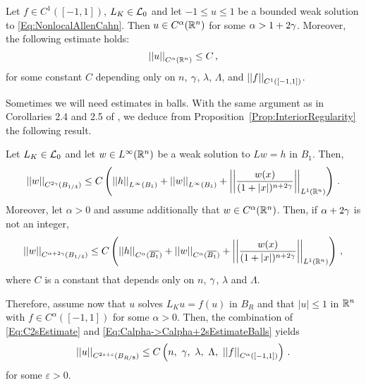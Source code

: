 \begin{corollary}
	\label{Cor:C2regularity} Let $f\in C^{1}([-1,1])$, $L_K \in \mathcal{L}_0$ and let $-1 \leq u \leq 1$ be a
	bounded weak solution to \eqref{Eq:NonlocalAllenCahn}. Then $u\in C^{\alpha}(\mathbb{R}^n)$ for some
	$\alpha
	> 1+ 2 \gamma$. Moreover, the following estimate holds:
	\begin{equation}
	\left | \left |{u} \right | \right |_{C^{\alpha}(\mathbb{R}^n)} \leq C\,,
	\end{equation}
	for some constant $C$ depending only on $n$, $\gamma$, $\lambda$, $\Lambda$, and $\left | \left |{f} \right | \right |_{C^1([-1,1])}$.
\end{corollary}


Sometimes we will need estimates in balls. With the same argument as in Corollaries 2.4 and 2.5 of \cite{RosOtonSerra-Regularity}, we deduce from Proposition~\ref{Prop:InteriorRegularity} the following result.

\begin{corollary}
	\label{Cor:InteriorRegularityBalls}
	Let $L_K \in\mathcal{L}_0$ and let $w\in L^\infty (\mathbb{R}^n)$ be a weak solution to $Lw = h$ in $B_1$. Then,
	\begin{equation}
	\label{Eq:C2sEstimateBalls}
	\left | \left |{w} \right | \right |_{C^{2\gamma} (B_{1/4})} \leq C\left ( {\left | \left |{h} \right | \right |_{L^\infty (B_1)} + \left | \left |{w} \right | \right |_{L^\infty  (B_1)} + \left | \left |{\dfrac{w(x)}{(1+|x|)^{n+2\gamma}}} \right | \right |_{L^1(\mathbb{R}^n)} }\right )\,.
	\end{equation}
	Moreover, let $\alpha > 0$ and assume additionally that $w \in C^\alpha (\mathbb{R}^n)$. Then, if $\alpha +
	2\gamma$ is not an integer,
	\begin{equation}
	\label{Eq:Calpha->Calpha+2sEstimateBalls}
	\left | \left |{w} \right | \right |_{C^{\alpha + 2\gamma} (B_{1/4})} \leq C\left ( {\left | \left |{h} \right | \right |_{C^{\alpha} (\overline{B_1})} + \left | \left |{w} \right | \right |_{C^\alpha (\overline{B_1})} + \left | \left |{\dfrac{w(x)}{(1+|x|)^{n+2\gamma}}} \right | \right |_{L^1(\mathbb{R}^n)} }\right )\,,
	\end{equation}
	where $C$ is a constant that depends only on $n$, $\gamma$, $\lambda$ and $\Lambda$.
\end{corollary}

Therefore, assume now that $u$ solves $L_K u = f(u)$ in $B_R$ and that $|u|\leq 1$ in $\mathbb{R}^n$ with $f\in C^{\alpha}([-1,1])$ for some $\alpha > 0$. Then, the combination of \eqref{Eq:C2sEstimate} and \eqref{Eq:Calpha->Calpha+2sEstimateBalls} yields
\begin{equation}
\label{Eq:UniformC2alphaEstimateBalls}
\norm{u}_{C^{2s + \varepsilon}(B_{R/8})} \leq C \bpar{n,\ \s ,\ \lambda,\ \Lambda ,\ \norm{f}_{C^{\alpha}([-1,1])} }\,.
\end{equation}
for some $\varepsilon > 0$.


